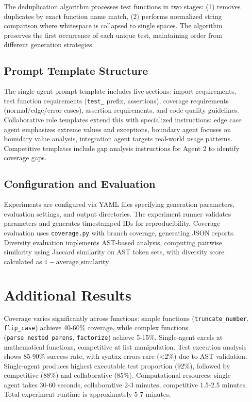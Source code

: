 \documentclass[11pt]{article}
\begin{document}
The deduplication algorithm processes test functions in two stages: (1) removes duplicates by exact function name match, (2) performs normalized string comparison where whitespace is collapsed to single spaces. The algorithm preserves the first occurrence of each unique test, maintaining order from different generation strategies.

\subsection{Prompt Template Structure}

The single-agent prompt template includes five sections: import requirements, test function requirements (\texttt{test\_} prefix, assertions), coverage requirements (normal/edge/error cases), assertion requirements, and code quality guidelines. Collaborative role templates extend this with specialized instructions: edge case agent emphasizes extreme values and exceptions, boundary agent focuses on boundary value analysis, integration agent targets real-world usage patterns. Competitive templates include gap analysis instructions for Agent 2 to identify coverage gaps.

\subsection{Configuration and Evaluation}

Experiments are configured via YAML files specifying generation parameters, evaluation settings, and output directories. The experiment runner validates parameters and generates timestamped IDs for reproducibility. Coverage evaluation uses \texttt{coverage.py} with branch coverage, generating JSON reports. Diversity evaluation implements AST-based analysis, computing pairwise similarity using Jaccard similarity on AST token sets, with diversity score calculated as $1 - \text{average\_similarity}$.

\section{Additional Results}
\label{app:additional}

Coverage varies significantly across functions: simple functions (\texttt{truncate\_number}, \texttt{flip\_case}) achieve 40-60\% coverage, while complex functions (\texttt{parse\_nested\_parens}, \texttt{factorize}) achieve 5-15\%. Single-agent excels at mathematical functions, competitive at list manipulation. Test execution analysis shows 85-90\% success rate, with syntax errors rare (<2\%) due to AST validation. Single-agent produces highest executable test proportion (92\%), followed by competitive (88\%) and collaborative (85\%). Computational resources: single-agent takes 30-60 seconds, collaborative 2-3 minutes, competitive 1.5-2.5 minutes. Total experiment runtime is approximately 5-7 minutes.
\end{document}

